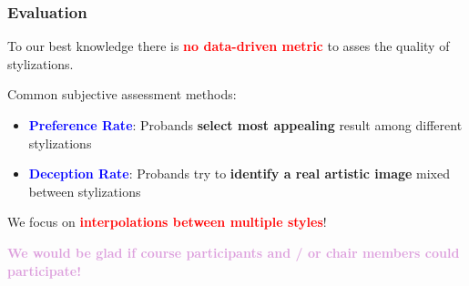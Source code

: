 \documentclass[11pt,xcolor=dvipsnames]{beamer}
\begin{document}
\begin{frame}
\frametitle{Evaluation}

To our best knowledge there is \textcolor{red}{\textbf{no data-driven metric}} to asses the quality of stylizations.

\vspace{10pt}

Common subjective assessment methods:

\begin{itemize}
	\item \textcolor{blue}{\textbf{Preference Rate}}: Probands \textbf{select most appealing} result among different stylizations
	\item \textcolor{blue}{\textbf{Deception Rate}}: Probands try to \textbf{identify a real artistic image} mixed between stylizations
\end{itemize}

\vspace{10pt}

We focus on \textbf{\textcolor{red}{interpolations between multiple styles}}!

\vspace{10pt}

\textcolor{Plum}{\textbf{We would be glad if course participants and / or chair members could participate!}}


\end{frame}
\end{document}
